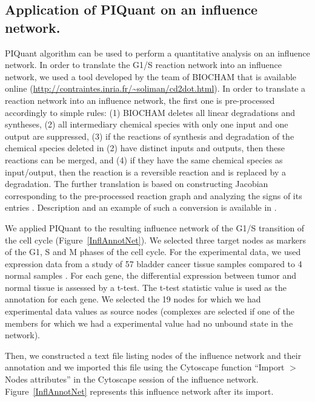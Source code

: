\documentclass[10pt]{bmc_article}
\newenvironment{bmcformat}{\baselineskip20pt\sloppy\setboolean{publ}{false}}{\baselineskip20pt\sloppy}
\begin{document}
\begin{bmcformat}
\subsection*{Application of PIQuant on an influence network.}
PIQuant algorithm can be used to perform a quantitative analysis on an influence
network. In order to translate the G1/S reaction network into an influence network, we used
a tool developed by the team of BIOCHAM \cite{calzone2006biocham} that is
available online (\url{http://contraintes.inria.fr/~soliman/cd2dot.html}). In order to translate a reaction network into an influence network, the first one is 
pre-processed accordingly to simple rules: (1) BIOCHAM deletes all linear
degradations and syntheses, (2) all intermediary chemical species with only one input and
one output are suppressed, (3) if the reactions of synthesis and degradation of
the chemical species deleted in (2) have distinct inputs and outputs, then these reactions
can be merged, and (4) if they have the same chemical species as input/output, then the reaction is a
reversible reaction and is replaced by a degradation. The further
translation is based on constructing Jacobian corresponding to the pre-processed reaction graph
and analyzing the signs of its entries \cite{fages2008frontiers}. Description and an example of such a conversion is
available in \cite{calzone2011calamar}.

We applied PIQuant to the resulting influence network of the G1/S transition of
the cell cycle (Figure~\ref{InflAnnotNet}). We selected three target nodes as
markers of the G1, S and M
phases of the cell cycle. For the experimental data, we used expression data
from a study of 57 bladder cancer
tissue samples compared to 4 normal samples \cite{stransky2006regional}. For
each gene, the differential expression between tumor and normal tissue
is assessed by a t-test. The t-test statistic value is used as the annotation
for each gene. We selected the 19 nodes for which we had experimental data
values as source nodes (complexes are selected if one of the members for which
we had a experimental value had no unbound state in the network).

Then, we constructed a text file listing nodes of the influence network
and their annotation and we imported this file using the Cytoscape function
``Import $>$ Nodes attributes''
in the Cytoscape session of the influence network.
Figure~\ref{InflAnnotNet} represents this influence network after its import.



\end{bmcformat}
\end{document}

